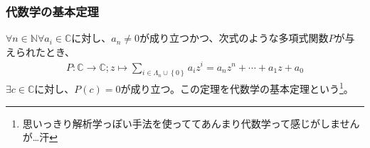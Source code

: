 \documentclass[dvipdfmx]{jsarticle}
\begin{document}
\subsubsection{代数学の基本定理}%
\begin{thm}[代数学の基本定理]\label{4.3.2.10}
$\forall n \in \mathbb{N}\forall a_{i} \in \mathbb{C}$に対し、$a_{n} \neq 0$が成り立つかつ、次式のような多項式関数$P$が与えられたとき、
\begin{align*}
P:\mathbb{C} \rightarrow \mathbb{C};z \mapsto \sum_{i \in \varLambda_{n} \cup \left\{ 0 \right\}} {a_{i}z^{i}} = a_{n}z^{n} + \cdots + a_{1}z + a_{0}
\end{align*}
$\exists c \in \mathbb{C}$に対し、$P(c) = 0$が成り立つ。この定理を代数学の基本定理という\footnote{思いっきり解析学っぽい手法を使っててあんまり代数学って感じがしませんが…汗}。
\end{thm}
\end{document}
